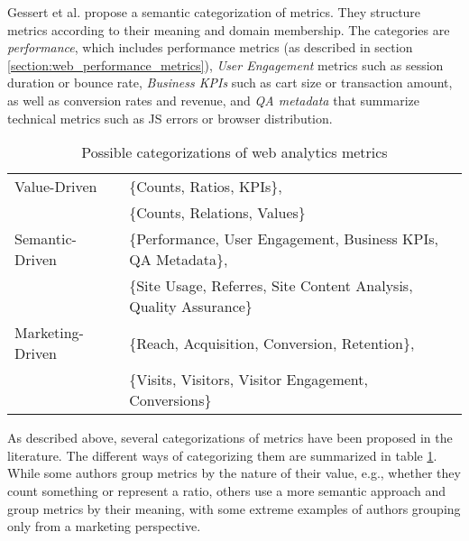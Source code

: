 Gessert et al. \cite{2020GessertWingerath} propose a semantic categorization of metrics.
They structure metrics according to their meaning and domain membership.
The categories are \textit{performance}, which includes performance metrics (as described in section \ref{section:web_performance_metrics}),
\textit{User Engagement} metrics such as session duration or bounce rate,
\textit{Business KPIs} such as cart size or transaction amount, as well as conversion rates and revenue,
and \textit{QA metadata} that summarize technical metrics such as JS errors or browser distribution.




\begin{table}[h]
	\small
	\centering
	\begin{tabular}{ | l | l | }
	\hline
	Value-Driven
	& \{Counts, Ratios, KPIs\},  \\
	& \{Counts, Relations, Values\} \\
	\hline
	Semantic-Driven
	& \{Performance, User Engagement, Business KPIs, QA Metadata\},  \\
	& \{Site Usage, Referres, Site Content Analysis, Quality Assurance\} \\
	\hline
	Marketing-Driven
	& \{Reach, Acquisition, Conversion, Retention\}, \\
	& \{Visits, Visitors, Visitor Engagement, Conversions\} \\
	\hline
	\end{tabular}
	\medskip
	\caption{Possible categorizations of web analytics metrics}
	\label{table:business_metrics_categorizations}
\end{table}



As described above, several categorizations of metrics have been proposed in the literature.
The different ways of categorizing them are summarized in table \ref{table:business_metrics_categorizations}.
While some authors group metrics by the nature of their value, e.g., whether they count something or represent a ratio, others use a more semantic approach and group metrics by their meaning, with some extreme examples of authors grouping only from a marketing perspective.

